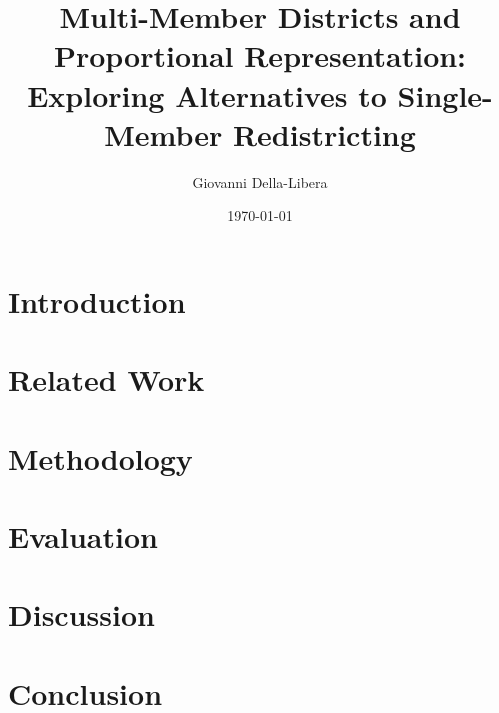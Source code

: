 \documentclass[12pt]{article}
\title{Multi-Member Districts and Proportional Representation: \\
       Exploring Alternatives to Single-Member Redistricting}
\author{Giovanni Della-Libera}
\date{\today}
\begin{document}
\maketitle

\begin{abstract}
\end{abstract}

\section{Introduction}


\section{Related Work}


\section{Methodology}


\section{Evaluation}


\section{Discussion}


\section{Conclusion}




\end{document}
